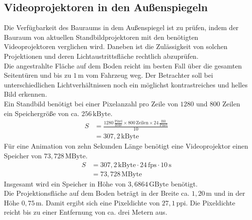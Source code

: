 \subsection{Videoprojektoren in den Außenspiegeln}
Die Verfügbarkeit des Bauraums in dem Außenspiegel ist zu prüfen, indem der Bauraum von aktuellen Standbildprojektoren mit den benötigten Videoprojektoren verglichen wird. 
Daneben ist die Zulässigkeit von solchen Projektionen und deren Lichtaustrittsfläche rechtlich abzuprüfen. \\
Die angestrahlte Fläche auf dem Boden reicht im besten Fall über die gesamten Seitentüren und bis zu $ 1\,\mathrm{m} $ vom Fahrzeug weg.
Der Betrachter soll bei unterschiedlichen Lichtverhältnissen noch ein möglichst kontrastreiches und helles Bild erkennen. \\
Ein Standbild benötigt bei einer Pixelanzahl pro Zeile von $ 1280 $ und $ 800 $ Zeilen ein Speichergröße von ca. $ 256\,\mathrm{kByte}$. 
\begin{align}
	S &= \frac{1280\,\frac{\mathrm{Pixel}}{\mathrm{Zeile}} \times 800\,\mathrm{Zeilen} \times 24\,\frac{\mathrm{Bit}}{\mathrm{Pixel}}}{10} \\
	&= 307,2\,\mathrm{kByte}
\end{align}
Für eine Animation von zehn Sekunden Länge benötigt eine Videoprojektor einen Speicher von $ 73,728\,\mathrm{MByte}$.
\begin{align}
	S &= 307,2\,\mathrm{kByte} \cdot 24\,\mathrm{fps} \cdot 10\,\mathrm{s}\\
	&= 73,728\,\mathrm{MByte} 
\end{align}
Insgesamt wird ein Speicher in Höhe von $ 3,6864\,\mathrm{GByte} $ benötigt. \\
Die Projektionsfläche auf dem Boden beträgt in der Breite ca. $ 1,20\,\mathrm{m} $ und in der Höhe $ 0,75\,\mathrm{m} $. Damit ergibt sich eine Pixeldichte von $ 27,1\,\mathrm{ppi} $. Die Pixeldichte reicht bis zu einer Entfernung von ca. drei Metern aus.
